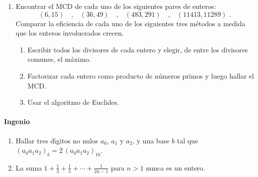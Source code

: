 \begin{enumerate}[label=P\arabic*]
	\item\label{item:mcd:ejemplos}
		Encontrar el MCD de cada uno de los siguientes pares de enteros:
		\begin{displaymath}
			(6,15)\quad\text{,}\quad
			(36,49)\quad\text{,}\quad
			(483,291)\quad\text{,}\quad
			(11413,11289)\text{ .}
		\end{displaymath}
		Comparar la eficiencia de cada uno de los siguientes tres m\'etodos a medida que los enteros
		involucrados crecen.
		\begin{enumerate}[label=(\arabic*)]
			\item\label{item:mcd:metodos:divisores}
				Escribir todos los divisores de cada entero y elegir, de entre los divisores
				comunes, el m\'aximo.
			\item\label{item:mcd:metodos:factores}
				Factorizar cada entero como producto de n\'umeros primos y luego hallar el MCD.
			\item\label{item:mcd:metodos:euclides}
				Usar el algoritmo de Euclides.
		\end{enumerate}
	\seti
\end{enumerate}
%

\paragraph{Ingenio}
\begin{enumerate}[label=P\arabic*]
	\conti
	\item\label{item:bases}
		Hallar tres d\'{\i}gitos no nulos $a_0$, $a_1$ y $a_2$, y una base $b$ tal que
		$(a_0a_1a_2)_b=2\,(a_0a_1a_2)_{10}$.
	\item\label{item:bases:fracciones}
		La suma $1+\frac{1}{3}+\frac{1}{5}+\cdots+\frac{1}{2n-1}$ para $n>1$ nunca es un entero.
% 
\end{enumerate}
%

